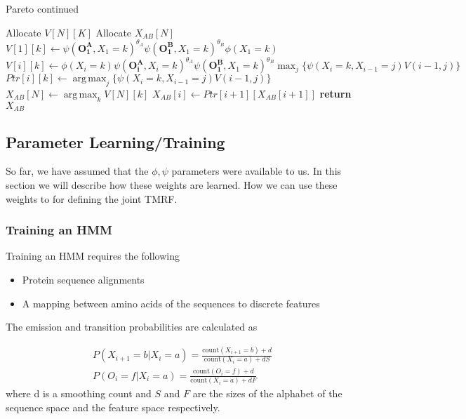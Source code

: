 \documentclass{article}
\DeclareMathOperator*{\argmax}{arg\,max}
\begin{document}
\begin{algorithm}
\caption{Pareto continued} \label{algo:pareto2}
\begin{algorithmic}[1]

	\State Allocate $V[N][K]$ 
	\State Allocate $X_{AB}[N]$	
		\State $V[1][k] \gets \psi(\mathbf{O^A_1},X_1{=}k)^{\theta_A}\psi(\mathbf{O^B_1},X_1{=}k)^{\theta_B}\phi(X_1{=}k)$
	\EndFor	
			\State $V[i][k] \gets \phi(X_i{=}k)\psi(\mathbf{O^A_i},X_i{=}k)^{\theta_A}\psi(\mathbf{O^B_1},X_1{=}k)^{\theta_B}
    \max_{j}\{\psi(X_{i}{=}k,X_{i-1}{=}j)V(i-1,j)\}$
			\State $Ptr[i][k] \gets \argmax_{j}\{\psi(X_{i}{=}k,X_{i-1}{=}j)V(i-1,j)\} $
		\EndFor		
	\EndFor
	\Statex {}
	\State $X_{AB}[N] \gets \argmax_{k}V[N][k]$ 
		\State	$X_{AB}[i] \gets Ptr[i+1][X_{AB}[i+1]]$
	\EndFor
	\State \bf{return} $X_{AB}$
\EndProcedure

\end{algorithmic}
\end{algorithm}

\pagebreak


\subsection{Parameter Learning/Training}
So far, we have assumed that the $\phi,\psi$ parameters were available to us. In this section we will describe how these weights are learned. How we can use these weights to for defining the joint TMRF.

\subsubsection{Training an HMM}
Training an HMM requires the following 
\begin{itemize}
\item Protein sequence alignments
\item A mapping between amino acids of the sequences to discrete features
\end{itemize}

The emission and transition probabilities are calculated as 

\begin{align*}
P(X_{i+1}=b|X_i=a) = \frac{\text{count}(X_{i+1}=b)+d}{\text{count}(X_i=a)+dS} \\
P(O_{i}=f|X_i=a) = \frac{\text{count}(O_{i}=f)+d}{\text{count}(X_i=a)+dF}
\end{align*}
where d is a smoothing count and $S$ and $F$ are the sizes of the alphabet of the sequence space and the feature space respectively. 
\end{document}
